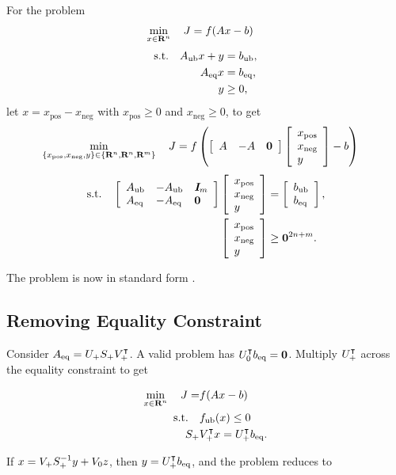 \documentclass{article}
\begin{document}
    For the problem 
    \begin{align*}
        \min_{x\in\textbf{R}^n}\quad J&=f(Ax-b)
    \end{align*}
    \begin{align*}
        \text{s.t.}\quad A_{\text{ub}} x+y&= b_{\text{ub}},\\
        A_{\text{eq}} x &= b_{\text{eq}},\\
        y&\geq0,
    \end{align*}
    let $x=x_{\text{pos}}-x_{\text{neg}}$ with $x_{\text{pos}}\geq0$ and $x_{\text{neg}}\geq0$, to get
    \begin{align*}
        \min_{\{x_{\text{pos}},x_{\text{neg}},y\}\in\{\textbf{R}^n,\textbf{R}^n,\textbf{R}^m\}}\quad J&=f\left(\left[\begin{array}{lllllllllllllllllll}A &-A & \textbf{0}\end{array}\right] \left[\begin{array}{lllllllllllllllllll}x_{\text{pos}}\\x_{\text{neg}}\\y\end{array}\right] -b\right)
    \end{align*}
    \begin{align*}
        \text{s.t.}\quad \left[\begin{array}{lllllllllllllllllll}A_{\text{ub}} & -A_{\text{ub}} & \emph{\textbf{I}}_m \\ A_{\text{eq}} & -A_{\text{eq}} & \textbf{0} \end{array}\right]\left[\begin{array}{lllllllllllllllllll}x_{\text{pos}}\\x_{\text{neg}}\\y\end{array}\right]&=
    \left[\begin{array}{lllllllllllllllllll}b_{\text{ub}}\\b_{\text{eq}}\end{array}\right],\\
        \left[\begin{array}{lllllllllllllllllll}x_{\text{pos}}\\x_{\text{neg}}\\y\end{array}\right]&\geq\textbf{0}^{2n+m}.
    \end{align*}

    The problem is now in standard form \cite[p.~147]{bv_cvxbook}.

\clearpage

\subsection{Removing Equality Constraint}\label{sec:rm_eq}

    Consider $A_{\text{eq}} = U_+S_+V_+^\intercal$.
    A valid problem has $U_0^\intercal b_{\text{eq}} = \textbf{0}$.
    Multiply $U_+^\intercal$ across the equality constraint to get

    \begin{align*}
        \min_{x\in\textbf{R}^n}\quad J = &f(Ax-b)\\
        \text{s.t.} \quad &f_{\text{ub}}(x)\leq 0\\
        S_+&V_+^\intercal x = U_+^\intercal b_{\text{eq}}.
    \end{align*}

    If $x=V_+ S_+^{-1} y + V_0 z$, then $y = U_+^\intercal b_{\text{eq}}$, 
    and the problem reduces to
\end{document}
